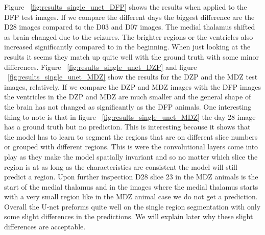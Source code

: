     Figure ~\ref{fig:results_single_unet_DFP} shows the results when applied to the DFP test images. 
    If we compare the different days the biggest difference are the D28 images compared to the D03 and D07 images. 
    The medial thalamus shifted as brain changed due to the seizures. 
    The brighter regions or the ventricles also increased significantly compared to in the beginning. 
    When just looking at the results it seems they match up quite well with the ground truth with some minor differences. 
    Figure ~\ref{fig:results_single_unet_DZP} and figure ~\ref{fig:results_single_unet_MDZ} show the results for the DZP and the MDZ test images, relatively.
    If we compare the DZP and MDZ images with the DFP images the ventricles in the DZP and MDZ are much smaller and the general shape of the brain has not changed as significantly as the DFP animals.
    One interesting thing to note is that in figure ~\ref{fig:results_single_unet_MDZ} the day 28 image has a ground truth but no prediction. 
    This is interesting because it shows that the model has to learn to segment the regions that are on different slice numbers or grouped with different regions. 
    This is were the convolutional layers come into play as they make the model spatially invariant and so no matter which slice the region is at as long as the characteristics are consistent the model will still predict a region. 
    Upon further inspection D28 slice 23 in the MDZ animals is the start of the medial thalamus and in the images where the medial thalamus starts with a very small region like in the MDZ animal case we do not get a prediction. 
    Overall the U-net preforms quite well on the single region segmentation with only some slight differences in the predictions. 
    We will explain later why these slight differences are acceptable. 
    

